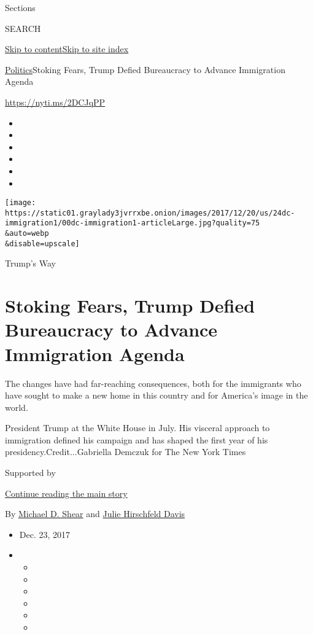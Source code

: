 Sections

SEARCH

\protect\hyperlink{site-content}{Skip to
content}\protect\hyperlink{site-index}{Skip to site index}

\href{/section/politics}{Politics}\textbar{}Stoking Fears, Trump Defied
Bureaucracy to Advance Immigration Agenda

\url{https://nyti.ms/2DCJqPP}

\begin{itemize}
\item
\item
\item
\item
\item
\item
\end{itemize}

\texttt{[image: https://static01.graylady3jvrrxbe.onion/images/2017/12/20/us/24dc-immigration1/00dc-immigration1-articleLarge.jpg?quality=75\\\&auto=webp\\\&disable=upscale]}

Trump's Way

\hypertarget{stoking-fears-trump-defied-bureaucracy-to-advance-immigration-agenda}{%
\section{Stoking Fears, Trump Defied Bureaucracy to Advance Immigration
Agenda}\label{stoking-fears-trump-defied-bureaucracy-to-advance-immigration-agenda}}

The changes have had far-reaching consequences, both for the immigrants
who have sought to make a new home in this country and for America's
image in the world.

President Trump at the White House in July. His visceral approach to
immigration defined his campaign and has shaped the first year of his
presidency.Credit...Gabriella Demczuk for The New York Times

Supported by

\protect\hyperlink{after-sponsor}{Continue reading the main story}

By \href{http://www.nytimes3xbfgragh.onion/by/michael-d-shear}{Michael
D. Shear} and
\href{https://www.nytimes3xbfgragh.onion/by/julie-hirschfeld-davis}{Julie
Hirschfeld Davis}

\begin{itemize}
\item
  Dec. 23, 2017
\item
  \begin{itemize}
  \item
  \item
  \item
  \item
  \item
  \item
  \end{itemize}
\end{itemize}

